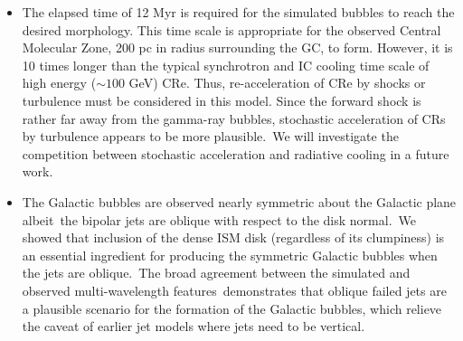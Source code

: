 \begin{itemize}
\item The elapsed time of 12 Myr is required for the simulated bubbles
      to reach the desired morphology.
      This time scale is appropriate for the observed Central Molecular Zone, 200 pc
      in radius surrounding the GC, to form. However, it is 10 times longer than
      the typical synchrotron and IC cooling time scale of
      high energy ($\sim100$ GeV) CRe. Thus, re-acceleration of CRe by shocks or turbulence must be considered
      in this model. Since the forward shock is rather far away from the gamma-ray bubbles,
      stochastic acceleration of CRs by turbulence appears to be more plausible.\
      We will investigate the competition between stochastic acceleration and radiative cooling
      in a future work.
\item The Galactic bubbles are observed nearly symmetric about the Galactic plane albeit\
      the bipolar jets are oblique with respect to the disk normal.\
      We showed that inclusion of the dense ISM disk (regardless of its clumpiness)
      is an essential ingredient for producing the symmetric Galactic bubbles when the jets are oblique.\
      The broad agreement between the simulated and observed multi-wavelength features\
      demonstrates that oblique failed jets are a plausible
      scenario for the formation of the Galactic bubbles,
      which relieve the caveat of earlier jet models where jets need to be vertical.

\end{itemize}


